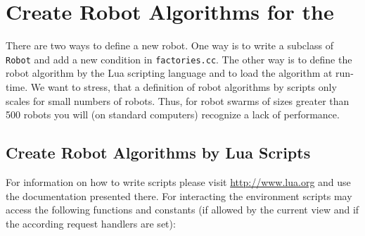 \documentclass[a4paper,halfparskip,11pt,twoside]{scrartcl}
\begin{document}
\section{Create Robot Algorithms for the \RSS}
There are two ways to define a new robot. One way is to write a subclass of \texttt{Robot} and add a new condition in \texttt{factories.cc}. The other way is to define the robot algorithm by the {\sffamily Lua} scripting language and to load the algorithm at run-time. We want to stress, that a definition of robot algorithms by \Lua scripts only scales for small numbers of robots. Thus, for robot swarms of sizes greater than 500 robots you will (on standard computers) recognize a lack of performance.

\subsection{Create Robot Algorithms by Lua Scripts}
For information on how to write \Lua scripts please visit \url{http://www.lua.org} and use the documentation presented there. For interacting the environment \Lua scripts may access the following functions and constants (if allowed by the current view and if the according request handlers are set):
\end{document}
